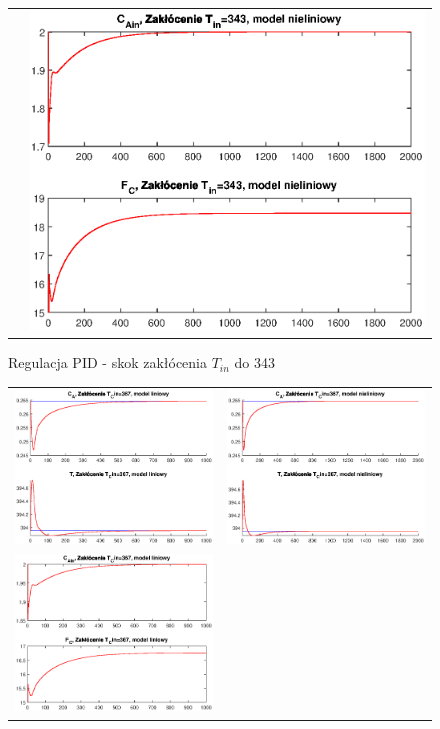 \begin{figure}
\begin{tabular}{cc}
	&
	\includegraphics[width=.5\linewidth]{img/pidnlin/pidnlin11.eps}
\end{tabular}
\label{ch2:pid6}
\caption{Regulacja PID - skok zakłócenia $T_{in}$ do 343}
\end{figure}
\newpage
\begin{figure}
\begin{tabular}{cc}
	\includegraphics[width=.5\linewidth]{img/pidlin/pidlin14.eps}
	&
	\includegraphics[width=.5\linewidth]{img/pidnlin/pidnlin14.eps}
	\\
	\includegraphics[width=.5\linewidth]{img/pidlin/pidlin13.eps}

\end{tabular}
\end{figure}
